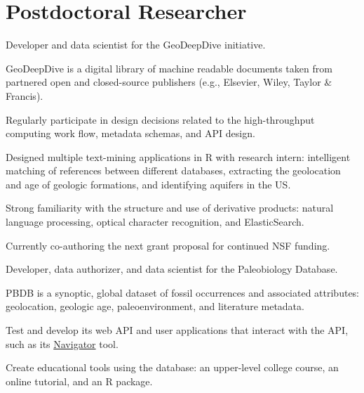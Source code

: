 \documentclass[]{deedy-resume-openfont}
\begin{document}
\begin{minipage}[t]{0.66\textwidth} 

\section{Postdoctoral Researcher}

\vspace{\topsep} %
\begin{tightemize}
\item Developer and data scientist for the GeoDeepDive initiative.
\item GeoDeepDive is a digital library of machine readable documents taken from partnered open and closed-source publishers (e.g., Elsevier, Wiley, Taylor \& Francis).
\item Regularly participate in design decisions related to the high-throughput computing work flow, metadata schemas, and API design.
\item Designed multiple text-mining applications in R with research intern: intelligent matching of references between different databases, extracting the geolocation and age of geologic formations, and identifying aquifers in the US.
\item Strong familiarity with the structure and use of derivative products: natural language processing, optical character recognition, and ElasticSearch.
\item Currently co-authoring the next grant proposal for continued NSF funding.
\end{tightemize}
\sectionsep

\begin{tightemize}
\item Developer, data authorizer, and data scientist for the Paleobiology Database. 
\item PBDB is a synoptic, global dataset of fossil occurrences and associated attributes: geolocation, geologic age, paleoenvironment, and literature metadata.
\item Test and develop its web API and user applications that interact with the API, such as its \href{https://paleobiodb.org/navigator/}{Navigator} tool.
\item Create educational tools using the database: an upper-level college course, an online tutorial, and an R package.
\end{tightemize}
\sectionsep


\end{minipage}
\end{document}
